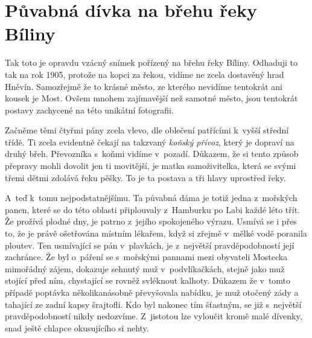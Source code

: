 
\chapter{Půvabná dívka na břehu řeky Bíliny}

Tak toto je opravdu vzácný snímek pořízený na břehu řeky Bíliny. Odhaduji to
tak na rok 1905, protože na kopci za řekou, vidíme ne zcela dostavěný hrad
Hněvín. Samozřejmě že to krásné město, ze kterého nevidíme tentokrát ani kousek
je Most. Ovšem mnohem zajímavější než samotné město, jsou tentokrát postavy
zachycené na této unikátní fotografii.

Začněme těmi čtyřmi pány zcela vlevo, dle oblečení patřícími k~vyšší střední
třídě. Ti zcela evidentně čekají na takzvaný {\em koňský přívoz}, který je
dopraví na druhý břeh. Převozníka s~koňmi vidíme v~pozadí. Důkazem, že si tento
způsob přepravy mohli dovolit jen ti movitější, je matka samoživitelka, která
se svými třemi dětmi zdolává řeku pěšky. To je ta postava a tři hlavy uprostřed
řeky.

A~teď k~tomu nejpodstatnějšímu. Ta půvabná dáma je totiž jedna z~mořských
panen, které se do této oblasti připlouvaly z~Hamburku po Labi každé léto třít.
Že prožívá plodné dny, je patrno z~jejího spokojeného výrazu. Usmívá se i přes
to, že je právě ošetřována místním lékařem, když si zřejmě v~mělké vodě
poranila ploutev. Ten usmívající se pán v~plavkách, je z~největší
pravděpodobností její zachránce. Že byl o~páření se s~mořskými pannami mezi
obyvateli Mostecka mimořádný zájem, dokazuje sehnutý muž v~podvlíkačkách,
stejně jako muž stojící před ním, chystající se rovněž svléknout kalhoty.
Důkazem že v~tomto případě poptávka několikanásobně převyšovala nabídku, je muž
otočený zády a tahající ze zadní kapsy šrajtofli. Kdo byl nakonec tím šťastným,
se již s~největší pravděpodobností nikdy nedozvíme. Z~jistotou lze vyloučit
kromě malé dívenky, snad ještě chlapce okusujícího si nehty.
